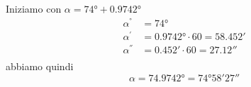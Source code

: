 	Iniziamo con
	$\alpha=\ang{74}+\ang{0.9742}$
	\begin{align*}
	\alpha^{\si{\degree}}&=\ang{74}\\
	\alpha^{\si{\arcminute}}&=\ang{0.9742}\cdot 60=\ang{;58.452;}\\
	\alpha^{\si{\arcsecond}}&=\ang{;0.452;}\cdot 60=\ang{;;27.12}\\
	\end{align*}
	abbiamo quindi
	\[\alpha=\ang{74.9742}=\ang{74;58;27}\]
